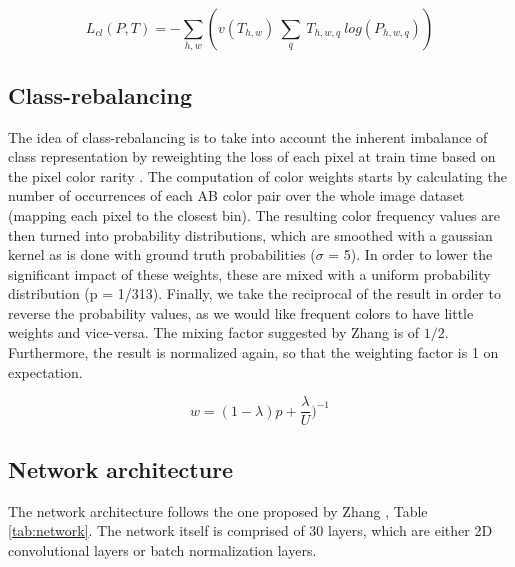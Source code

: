 \documentclass[twoside,twocolumn]{article}
\begin{document}
\begin{equation}
L_{cl}(P,T) = - \sum_{h,w}(v(T_{h,w}) \: \sum_{q} \: T_{h,w,q} \: log(P_{h,w,q}))
\end{equation}

\subsection{Class-rebalancing}

The idea of class-rebalancing is to take into account the inherent imbalance of class representation by reweighting the loss of each pixel at train time based on the pixel color rarity \cite{Zhang:2016}. The computation of color weights starts by calculating the number of occurrences of each AB color pair over the whole image dataset (mapping each pixel to the closest bin). The resulting color frequency values are then turned into probability distributions, which are smoothed with a gaussian kernel as is done with ground truth probabilities ($\sigma$ = 5). In order to lower the significant impact of these weights, these are mixed with a uniform probability distribution (p = 1/313). Finally, we take the reciprocal of the result in order to reverse the probability values, as we would like frequent colors to have little weights and vice-versa. The mixing factor suggested by Zhang \cite{Zhang:2016} is of $1/2$. Furthermore, the result is normalized again, so that the weighting factor is 1 on expectation.


\begin{equation}
w = (1 - \lambda)p + \frac{\lambda}{U})^{-1}
\end{equation}


\subsection{Network architecture}

The network architecture follows the one proposed by Zhang \cite{Zhang:2016}, Table \ref{tab:network}. The network itself is comprised of 30 layers, which are either 2D convolutional layers or batch normalization layers.
\end{document}
